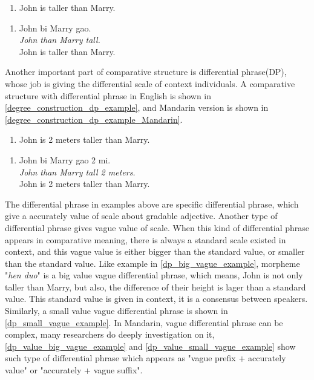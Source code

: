 \documentclass{ctexart}
\let \cite \parencite
\begin{document}
\begin{enumerate}
    \item \label{degree_construction_example}
    John is taller than Marry.
\end{enumerate}

\begin{enumerate}[resume]
    \item \label{degree_construction_example_Mandarin}
    John bi Marry gao.  \\
    \textit{John than Marry tall.} \\
    John is taller than Marry.
\end{enumerate}

Another important part of comparative structure is differential phrase(DP), whose job is giving the differential scale of context individuals. A comparative structure with differential phrase in English is shown in \ref{degree_construction_dp_example}, and Mandarin version is shown in \ref{degree_construction_dp_example_Mandarin}.

\begin{enumerate}[resume]
    \item \label{degree_construction_dp_example}
    John is 2 meters taller than Marry.
\end{enumerate}

\begin{enumerate}[resume]
    \item \label{degree_construction_dp_example_Mandarin}
    John bi Marry gao 2 mi.  \\
    \textit{John than Marry tall 2 meters.} \\
    John is 2 meters taller than Marry.
\end{enumerate}

The differential phrase in examples above are specific differential phrase, which give a accurately value of scale about gradable adjective. Another type of differential phrase gives vague value of scale. When this kind of differential phrase appears in comparative meaning, there is always a standard scale existed in context, and this vague value is either bigger than the standard value, or smaller than the standard value. Like example in \ref{dp_big_vague_example}, morpheme "\textit{hen duo}" is a big value vague differential phrase, which means, John is not only taller than Marry, but also, the difference of their height is lager than a standard value. This standard value is given in context, it is a consensus between speakers. Similarly, a small value vague differential phrase is shown in \ref{dp_small_vague_example}. In Mandarin, vague differential phrase can be complex, many researchers \cite{lin2014,li2015} do deeply investigation on it, \ref{dp_value_big_vague_example} and \ref{dp_value_small_vague_example} show such type of differential phrase which appears as "vague prefix + accurately value" or "accurately + vague suffix".
\end{document}
